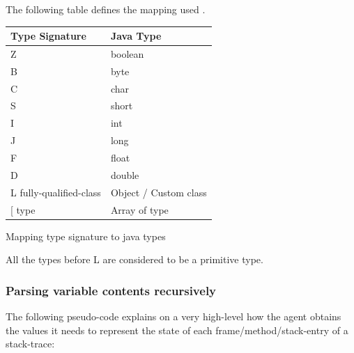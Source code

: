The following table defines the mapping used \cite{jniTypes}.

\begin{listing}[H]

\begin{center}
    \begin{tabular}{ |l|l| }
      \hline
        Type Signature & Java Type \\
      \hline
      Z & boolean \\
            \hline

      B & byte \\
            \hline

      C & char \\
            \hline

      S & short \\
            \hline

      I & int \\
            \hline

      J & long \\
            \hline

      F & float \\
            \hline

      D & double \\
            \hline

      L fully-qualified-class & Object / Custom class \\
            \hline

      {[} type & Array of type \\
      \hline

    \end{tabular}
\end{center}

\caption{Mapping type signature to java types}
\end{listing}

All the types before L are considered to be a primitive type. 

\subsubsection{Parsing variable contents recursively}

The following pseudo-code explains on a very high-level how the agent obtains the values it needs to represent the state of each frame/method/stack-entry of a stack-trace:

